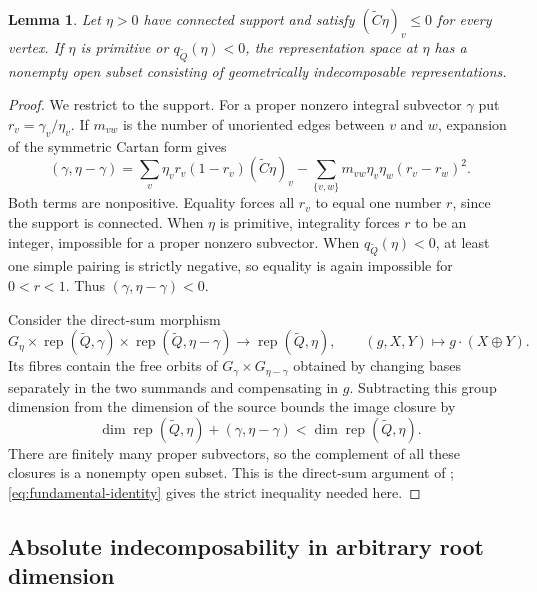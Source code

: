 \documentclass[11pt, reqno]{amsart}
\numberwithin{equation}{section}
\newtheorem{lemma}[theorem]{Lemma}
\theoremstyle{definition}
\theoremstyle{remark}
\newcommand{\op}[1]{\operatorname{#1}}
\newcommand{\Rep}{\op{rep}}
\newcommand{\Qbar}{\widetilde Q}
\begin{document}
\begin{lemma}\label{lem:fundamental-open}
Let $\eta>0$ have connected support and satisfy
$(\widetilde C\eta)_v\le0$ for every vertex. If $\eta$ is primitive
or $q_{\Qbar}(\eta)<0$, the representation space at $\eta$ has a
nonempty open subset consisting of geometrically indecomposable
representations.
\end{lemma}
\begin{proof}
We restrict to the support. For a proper nonzero integral subvector
$\gamma$ put $r_v=\gamma_v/\eta_v$. If $m_{vw}$ is the number of
unoriented edges between $v$ and $w$, expansion of the symmetric
Cartan form gives
\begin{equation}\label{eq:fundamental-identity} (\gamma,\eta-\gamma) =\sum_v\eta_vr_v(1-r_v)(\widetilde C\eta)_v -\sum_{\{v,w\}}m_{vw}\eta_v\eta_w(r_v-r_w)^2.\end{equation}
Both terms are nonpositive. Equality forces all $r_v$ to equal one
number $r$, since the support is connected. When $\eta$ is primitive,
integrality forces $r$ to be an integer, impossible for a proper
nonzero subvector. When $q_{\Qbar}(\eta)<0$, at least one simple pairing
is strictly negative, so equality is again impossible for $0<r<1$.
Thus $(\gamma,\eta-\gamma)<0$.

Consider the direct-sum morphism
\[ G_\eta\times\Rep(\Qbar,\gamma)\times\Rep(\Qbar,\eta-\gamma) \longrightarrow\Rep(\Qbar,\eta),\qquad (g,X,Y)\longmapsto g\cdot(X\oplus Y). \]
Its fibres contain the free orbits of
$G_\gamma\times G_{\eta-\gamma}$ obtained by changing bases separately
in the two summands and compensating in $g$. Subtracting this group
dimension from the dimension of the source bounds the image closure by
\[ \dim\Rep(\Qbar,\eta)+(\gamma,\eta-\gamma) <\dim\Rep(\Qbar,\eta). \]
There are finitely many proper subvectors, so the complement of all
these closures is a nonempty open subset. This is the direct-sum
argument of \cite[Lemmas~8.3.2--8.3.3]{DWbook};
\eqref{eq:fundamental-identity} gives the strict inequality needed here.
\end{proof}


\subsection{Absolute indecomposability in arbitrary root dimension}
\end{document}
